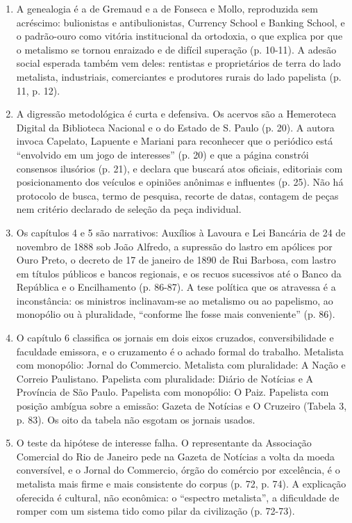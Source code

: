 \begin{enumerate}[leftmargin=*,nosep]
\item A genealogia é a de Gremaud e a de Fonseca e Mollo, reproduzida sem
acréscimo: bulionistas e antibulionistas, Currency School e Banking School, e o
padrão-ouro como vitória institucional da ortodoxia, o que explica por que o
metalismo se tornou enraizado e de difícil superação (p. 10-11). A adesão
social esperada também vem deles: rentistas e proprietários de terra do lado
metalista, industriais, comerciantes e produtores rurais do lado papelista
(p. 11, p. 12).

\item A digressão metodológica é curta e defensiva. Os acervos são a
Hemeroteca Digital da Biblioteca Nacional e o do Estado de S. Paulo (p. 20).
A autora invoca Capelato, Lapuente e Mariani para reconhecer que o periódico
está ``envolvido em um jogo de interesses'' (p. 20) e que a página constrói
consensos ilusórios (p. 21), e declara que buscará atos oficiais, editoriais
com posicionamento dos veículos e opiniões anônimas e influentes (p. 25). Não
há protocolo de busca, termo de pesquisa, recorte de datas, contagem de peças
nem critério declarado de seleção da peça individual.

\item Os capítulos 4 e 5 são narrativos: Auxílios à Lavoura e Lei Bancária de
24 de novembro de 1888 sob João Alfredo, a supressão do lastro em apólices por
Ouro Preto, o decreto de 17 de janeiro de 1890 de Rui Barbosa, com lastro em
títulos públicos e bancos regionais, e os recuos sucessivos até o Banco da
República e o Encilhamento (p. 86-87). A tese política que os atravessa é a
inconstância: os ministros inclinavam-se ao metalismo ou ao papelismo, ao
monopólio ou à pluralidade, ``conforme lhe fosse mais conveniente'' (p. 86).

\item O capítulo 6 classifica os jornais em dois eixos cruzados,
conversibilidade e faculdade emissora, e o cruzamento é o achado formal do
trabalho. Metalista com monopólio: Jornal do Commercio. Metalista com
pluralidade: A Nação e Correio Paulistano. Papelista com pluralidade: Diário
de Notícias e A Província de São Paulo. Papelista com monopólio: O Paiz.
Papelista com posição ambígua sobre a emissão: Gazeta de Notícias e O Cruzeiro
(Tabela 3, p. 83). Os oito da tabela não esgotam os jornais usados.

\item O teste da hipótese de interesse falha. O representante da Associação
Comercial do Rio de Janeiro pede na Gazeta de Notícias a volta da moeda
conversível, e o Jornal do Commercio, órgão do comércio por excelência, é o
metalista mais firme e mais consistente do corpus (p. 72, p. 74). A explicação
oferecida é cultural, não econômica: o ``espectro metalista'', a dificuldade de
romper com um sistema tido como pilar da civilização (p. 72-73).
\end{enumerate}

